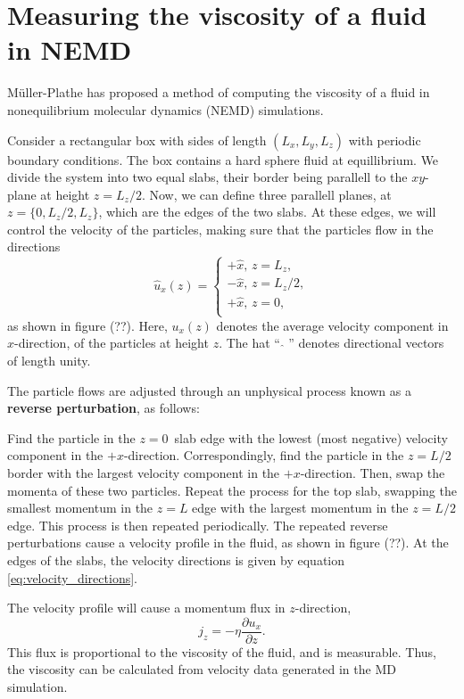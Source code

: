 \section{Measuring the viscosity of a fluid in NEMD}
Müller-Plathe \cite{ref:mullerplathe:reversing_the_perturbation} 
has proposed a method of computing the viscosity of a fluid in 
nonequilibrium molecular dynamics (NEMD) simulations.

Consider a rectangular box with sides of length $(L_x, L_y, L_z)$ 
with periodic boundary conditions.
The box contains a hard sphere fluid at equillibrium.
We divide the system into two equal slabs, their border 
being parallell to the $xy$-plane at height $z = L_z/2$.
Now, we can define three parallell planes, at 
$z = \{0, L_z/2, L_z\}$, which are the edges of the two slabs.
At these edges, we will control the velocity of the particles, 
making sure that the particles flow in the directions
\begin{equation}
    \label{eq:velocity_directions}
    \hat{u}_x(z) =
    \begin{cases}
        +\hat{x}, \,z = L_z,    \\
        -\hat{x}, \,z = L_z/2,  \\
        +\hat{x}, \,z = 0,    \\
    \end{cases}
\end{equation}
as shown in figure (??). %
Here, $u_x(z)$ denotes the average velocity component 
in $x$-direction, of the particles at height $z$.
The hat ``$\,\, \hat{ } \,\,$'' denotes 
directional vectors of length unity.

The particle flows are adjusted through an unphysical process known as a 
\textbf{reverse perturbation}\cite{ref:mullerplathe:reversing_the_perturbation},
as follows:

Find the particle in the $z = 0$ slab edge with the lowest 
(most negative) velocity component in the $+x$-direction.
Correspondingly, find the particle in the $z = L/2$ border 
with the largest velocity component in the $+x$-direction.
Then, swap the momenta of these two particles.
Repeat the process for the top slab, swapping the smallest momentum 
in the $z = L$ edge with the largest momentum in the $z = L/2$ edge.
This process is then repeated periodically.
The repeated reverse perturbations cause a velocity profile in the fluid,
as shown in figure (??). %
At the edges of the slabs, the velocity directions 
is given by equation \eqref{eq:velocity_directions}.

The velocity profile will cause a momentum flux in $z$-direction,
\begin{equation}
    \label{eq:momentum_flux}
    j_z = -\eta \frac{\partial u_x}{\partial z}.
\end{equation}
This flux is proportional to the viscosity of the fluid, and is measurable.
Thus, the viscosity can be calculated from velocity data generated in the 
MD simulation.

